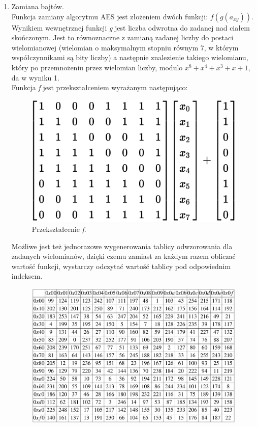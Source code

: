 \begin{enumerate}
	\item Zamiana bajtów. \\
			Funkcja zamiany algorytmu AES jest złożeniem dwóch funkcji: $f(g(a_{xy})).$ \\
			Wynikiem wewnętrznej funkcji \textit{g} jest liczba odwrotna do zadanej nad ciałem skończonym.
			Jest to równoznaczne z zamianą zadanej liczby do postaci wielomianowej (wielomian o maksymalnym 
			stopniu równym 7, w którym współczynnikami są bity liczby) a następnie znalezienie takiego
			wielomianu, który po przemnożeniu przez wielomian liczby, modulo $x^8+x^4+x^3+x+1$, da w wyniku 1. \\
			Funkcja \textit{f} jest przekształceniem wyrażanym następująco: \\
			\begin{figure}[H]
			    \centering
			    \includegraphics[scale=0.5]{content/images/affin}
				\caption{Przekształcenie \textit{f}.}
			\end{figure}
			Możliwe jest też jednorazowe wygenerowania tablicy odwzorowania dla zadanych wielomianów,
			dzięki czemu zamiast za każdym razem obliczać wartość funkcji, wystarczy odczytać wartość tablicy
			pod odpowiednim indeksem. 
			\begin{figure}[H]
			    \centering
			    \includegraphics[width=\textwidth]{content/images/sbox}

\end{figure}
\end{enumerate}
